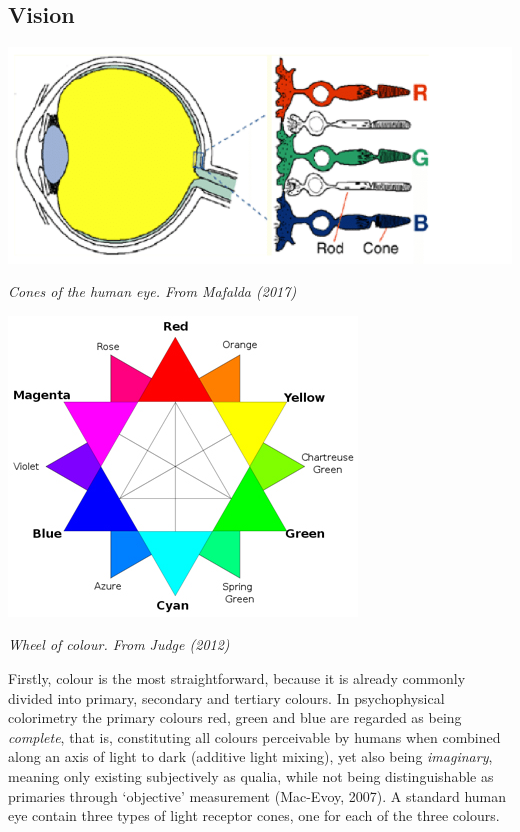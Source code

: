 \vspace*{-1cm}
\subsection{Vision}


\begin{center}
\includegraphics[scale=0.3]{./Images/eyes.jpeg}

{\it \footnotesize Cones of the human eye. From Mafalda (2017)}

\end{center}
\begin{center}

\includegraphics[scale=0.4]{./Images/colorwheel.jpg}

{\it \footnotesize Wheel of colour. From Judge (2012)}
\end{center}


\noindent Firstly, colour is the most straightforward, because it is already commonly divided into primary, secondary and tertiary colours. In psychophysical colorimetry the primary colours red, green and blue are regarded as being \textit{complete}, that is, constituting all colours perceivable by humans when combined along an axis of light to dark (additive light mixing), yet also being \textit{imaginary}, meaning only existing subjectively as qualia, while not being distinguishable as primaries through ‘objective’ measurement (Mac-Evoy, 2007). A standard human eye contain three types of light receptor cones, one for each of the three colours. 

